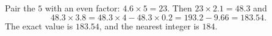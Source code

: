 Pair the $5$ with an even factor: $4.6\times5=23$. Then $23\times2.1=48.3$ and
\[
48.3\times3.8=48.3\times4-48.3\times0.2=193.2-9.66=183.54 .
\]
The exact value is $183.54$, and the nearest integer is $\boxed{184}$.
